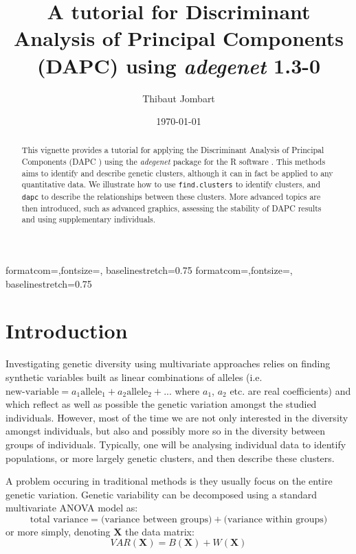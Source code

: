 \documentclass{article}
\title{A tutorial for Discriminant Analysis of Principal Components (DAPC) using \textit{adegenet} 1.3-0}
\author{Thibaut Jombart}
\date{\today}
\newcommand{\m}[1]{\mathbf{#1}}
\newcommand{\code}[1]{{{\tt #1}}}
\begin{document}
{formatcom={\color{Sinput}},fontsize=\footnotesize, baselinestretch=0.75}
{formatcom={\color{Soutput}},fontsize=\footnotesize, baselinestretch=0.75}

\color{black}

\maketitle

\begin{abstract}
  This vignette provides a tutorial for applying the Discriminant Analysis of Principal Components
  (DAPC \cite{tjart19}) using the \textit{adegenet} package \cite{tjart05} for the R software
  \cite{np145}. This methods aims to identify and describe genetic clusters, although it can in fact
  be applied to any quantitative data. We illustrate how to use \code{find.clusters} to identify
  clusters, and \code{dapc} to describe the relationships between these clusters. More advanced
  topics are then introduced, such as advanced graphics, assessing the stability of DAPC results and
  using supplementary individuals.
\end{abstract}


\newpage
\tableofcontents


\newpage
\section{Introduction}


Investigating genetic diversity using multivariate approaches relies on finding synthetic variables
built as linear combinations of alleles (i.e. $\mbox{new-variable} = a_1 \mbox{allele}_1 + a_2 \mbox{allele}_2 + ... $
where $a_1$, $a_2$ etc. are real coefficients)
and which reflect as well as possible the genetic variation amongst the studied individuals.
However, most of the time we are not only interested in the diversity amongst individuals, but
also and possibly more so in the diversity between groups of individuals.
Typically, one will be analysing individual data to identify populations, or more largely genetic
clusters, and then describe these clusters.

A problem occuring in traditional methods is they usually focus on the entire genetic variation.
Genetic variability can be decomposed using a standard multivariate ANOVA model as:
$$
\mbox{total variance} = \mbox{(variance between groups)} + \mbox{(variance within groups)}
$$
or more simply, denoting $\m{X}$ the data matrix:
$$
VAR(\m{X}) = B(\m{X}) + W(\m{X})
$$
\end{document}
